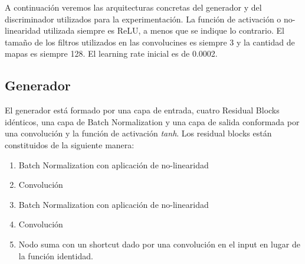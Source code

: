 \documentclass[spanish]{report}
\begin{document}
A continuación veremos las arquitecturas concretas del generador y del discriminador  utilizados para la experimentación. La función de activación o no-linearidad utilizada siempre es ReLU, a menos que se indique lo contrario. El tamaño de los filtros utilizados en las convolucines es siempre 3 y la cantidad de mapas es siempre 128. El learning rate inicial es de 0.0002.

\subsection{Generador}

El generador está formado por una capa de entrada, cuatro Residual Blocks idénticos, una capa de Batch Normalization y una capa de salida conformada por una convolución y la función de activación \textit{tanh}. Los residual blocks están constituidos de la siguiente manera:

\begin{enumerate}
\item Batch Normalization con aplicación de no-linearidad
\item Convolución
\item Batch Normalization con aplicación de no-linearidad
\item Convolución
\item Nodo suma con un shortcut dado por una convolución en el input en lugar de la función identidad.
\end{enumerate}
\end{document}
